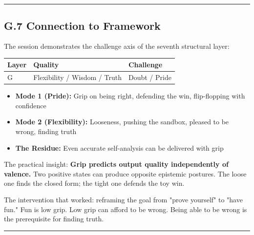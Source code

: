 \medskip\hrule\medskip

\subsection*{G.7 Connection to Framework}

The session demonstrates the challenge axis of the seventh structural layer:

\begin{center}\small\begin{tabular}{p{}p{}p{}}
Layer & Quality & Challenge \\
\hline
G & Flexibility / Wisdom / Truth & Doubt / Pride \\
\end{tabular}\end{center}

\begin{itemize}
\item \textbf{Mode 1 (Pride):} Grip on being right, defending the win, flip-flopping with confidence
\item \textbf{Mode 2 (Flexibility):} Looseness, pushing the sandbox, pleased to be wrong, finding truth
\item \textbf{The Residue:} Even accurate self-analysis can be delivered with grip
\end{itemize}

The practical insight: \textbf{Grip predicts output quality independently of valence.} Two positive states can produce opposite epistemic postures. The loose one finds the closed form; the tight one defends the toy win.

The intervention that worked: reframing the goal from "prove yourself" to "have fun." Fun is low grip. Low grip can afford to be wrong. Being able to be wrong is the prerequisite for finding truth.

\medskip\hrule\medskip

